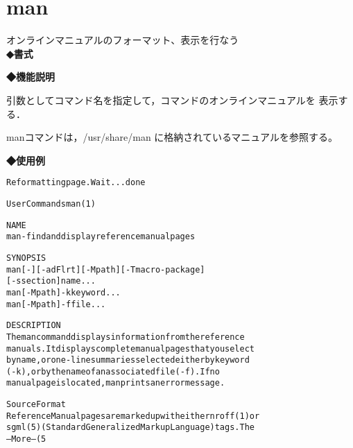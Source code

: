 
\section{man}
オンラインマニュアルのフォーマット、表示を行なう\\
\label{cmd:man}
\noindent
{\bf ◆書式}
\begin{center}
\begin{screen}
\begin{alltt}
% man コマンド名
\end{alltt}
\end{screen}
\end{center}

\noindent
{\bf ◆機能説明}

引数としてコマンド名を指定して，コマンドのオンラインマニュアルを
表示する．\par
manコマンドは，/usr/share/man に格納されているマニュアルを参照する。\par
\noindent
{\bf ◆使用例}
\begin{center}
\begin{breakbox}
\begin{alltt}
% \underline{man man}

Reformatting page.  Wait... done

User Commands                                              man(1)

NAME
     man - find and display reference manual pages

SYNOPSIS
     man [ - ] [ -adFlrt ] [ -M path ] [ -T macro-package ]
          [-s section ] name ...
     man [ -M path ] -k keyword ...
     man [ -M path ] -f file ...

DESCRIPTION
     The man command  displays  information  from  the  reference
     manuals.   It displays complete manual pages that you select
     by name, or one-line summaries selected  either  by  keyword
     (-k),  or  by  the  name  of an associated file (-f).  If no
     manual page is located, man prints an error message.

  Source Format
     Reference Manual pages are marked up with either nroff(1) or
     sgml(5)  (Standard  Generalized  Markup Language) tags.  The
--More--(5%)
%
\end{alltt}
\end{breakbox}
\end{center}
\clearpage
